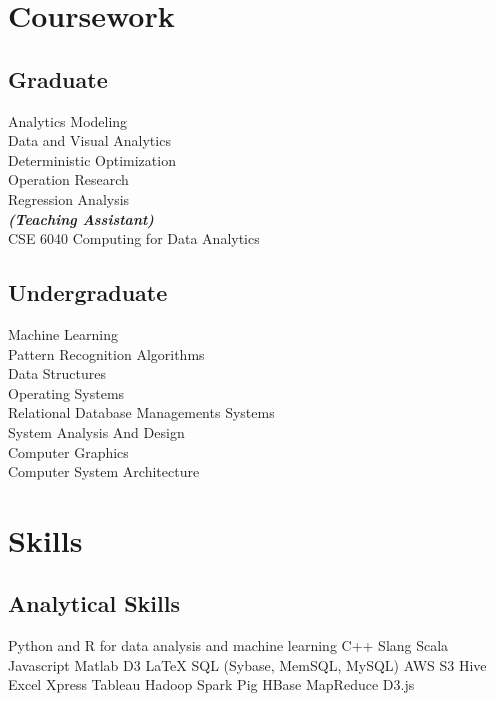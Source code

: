 \documentclass[]{resume-openfont}
\begin{document}
\begin{minipage}[t]{0.33\textwidth}
\section{Coursework}
\subsection{Graduate}
Analytics Modeling\\ 
Data and Visual Analytics \\ 
Deterministic Optimization \\ 
Operation Research \\
Regression Analysis \\
{\footnotesize \textit{\textbf{(Teaching Assistant)}}} \\
CSE 6040 Computing for Data Analytics \\
\sectionsep

\subsection{Undergraduate}
Machine Learning \\ 
Pattern Recognition
Algorithms \\ 
Data Structures \\
Operating Systems \\ 
Relational Database Managements Systems \\
System Analysis And Design \\ 
Computer Graphics \\ 
Computer System Architecture \\


\section{Skills}
\subsection{Analytical Skills}
Python and R for data analysis and machine learning \textbullet{}   C++ \textbullet{} Slang \textbullet{} Scala \\
Javascript \textbullet{} Matlab \textbullet{} D3 \textbullet{} \LaTeX  
\vspace{6pt}
SQL (Sybase, MemSQL, MySQL) \textbullet{} AWS S3 \textbullet{} Hive \textbullet{} Excel \textbullet{} Xpress \textbullet{} Tableau\vspace{6pt}
Hadoop \textbullet{} Spark \textbullet{} Pig \textbullet{} HBase \textbullet{} MapReduce \textbullet{} D3.js 
\sectionsep


\end{minipage}
\end{document}
